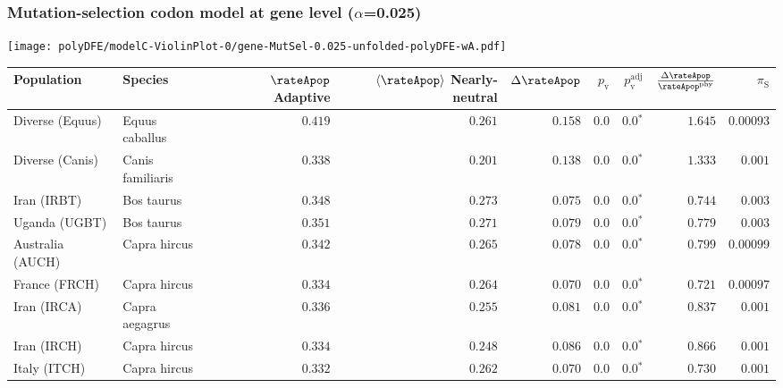 \subsubsection*{Mutation-selection codon model at gene level ($\alpha$=0.025)}
\begin{center}
    \texttt{[image: polyDFE/modelC-ViolinPlot-0/gene-MutSel-0.025-unfolded-polyDFE-wA.pdf]}
    \begin{adjustbox}{width = 1\textwidth}
        \begin{tabular}{|l|l|r|r|r|r|r|r|r|}
            \toprule
            Population & Species & \specialcell{$\rateApop$ \\ Adaptive}                & \specialcell{$\left< \rateApop \right>$ \\ Nearly-neutral}                & $\Delta \rateApop $    & $p_{\mathrm{v}}$ & $p_{\mathrm{v}}^{\mathrm{adj}}$ & $\frac{\Delta\rateApop}{\rateApop^{\mathrm{phy}}}$ & $\pi_{\textrm{S}}$ \\
            \midrule
            Diverse (Equus)                    & Equus caballus          & $ 0.419$ & $ 0.261$ & $ 0.158$ & $0.0$ & $\bm{0.0{^*}}$ & $ 1.645$ & $0.00093$  \\
            Diverse (Canis)                  & Canis familiaris          & $ 0.338$ & $ 0.201$ & $ 0.138$ & $0.0$ & $\bm{0.0{^*}}$ & $ 1.333$ & $ 0.001$ \\
            Iran (IRBT)               & Bos taurus        & $ 0.348$ & $ 0.273$ & $ 0.075$ & $0.0$ & $\bm{0.0{^*}}$ & $ 0.744$ & $ 0.003$ \\
            Uganda (UGBT)                  & Bos taurus        & $ 0.351$ & $ 0.271$ & $ 0.079$ & $0.0$ & $\bm{0.0{^*}}$ & $ 0.779$ & $ 0.003$ \\
            Australia (AUCH)                    & Capra hircus      & $ 0.342$ & $ 0.265$ & $ 0.078$ & $0.0$ & $\bm{0.0{^*}}$ & $ 0.799$ & $0.00099$ \\
            France (FRCH)                    & Capra hircus        & $ 0.334$ & $ 0.264$ & $ 0.070$ & $0.0$ & $\bm{0.0{^*}}$ & $ 0.721$ & $0.00097$ \\
            Iran (IRCA)                   & Capra aegagrus        & $ 0.336$ & $ 0.255$ & $ 0.081$ & $0.0$ & $\bm{0.0{^*}}$ & $ 0.837$ & $ 0.001$ \\
            Iran (IRCH)                 & Capra hircus        & $ 0.334$ & $ 0.248$ & $ 0.086$ & $0.0$ & $\bm{0.0{^*}}$ & $ 0.866$ & $ 0.001$ \\
            Italy (ITCH)                    & Capra hircus          & $ 0.332$ & $ 0.262$ & $ 0.070$ & $0.0$ & $\bm{0.0{^*}}$ & $ 0.730$ & $ 0.001$  \\

\end{tabular}
\end{adjustbox}
\end{center}

